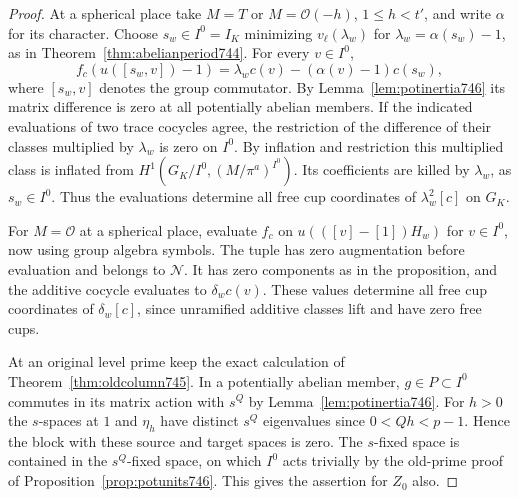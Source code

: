 \documentclass[a4paper,11pt]{article}
\theoremstyle{definition}
\theoremstyle{remark}
\numberwithin{equation}{section}
\begin{document}
\begin{proof}
At a spherical place take \(M=T\) or \(M=\mathcal O(-h)\),
\(1\le h<t'\), and write \(\alpha\) for its character. Choose
\(s_w\in I^0=I_K\) minimizing \(v_\ell(\lambda_w)\) for
\(\lambda_w=\alpha(s_w)-1\), as in
Theorem~\ref{thm:abelianperiod744}. For every \(v\in I^0\),
\[
 f_c(u([s_w,v])-1)=
      \lambda_w c(v)-(\alpha(v)-1)c(s_w),
\]
where \([s_w,v]\) denotes the group commutator. By
Lemma~\ref{lem:potinertia746} its matrix difference is zero at
all potentially abelian members. If the indicated evaluations
of two trace cocycles agree, the restriction of the difference
of their classes multiplied by \(\lambda_w\) is zero on \(I^0\).
By inflation and restriction this multiplied class is inflated
from \(H^1(G_K/I^0,(M/\pi^a)^{I^0})\). Its coefficients are
killed by \(\lambda_w\), as \(s_w\in I^0\). Thus the evaluations
determine all free cup coordinates of \(\lambda_w^2[c]\)
on \(G_K\).

For \(M=\mathcal O\) at a spherical place, evaluate \(f_c\)
on \(u(([v]-[1])H_w)\) for \(v\in I^0\), now using group
algebra symbols. The tuple has zero augmentation before
evaluation and belongs to \(\mathcal N\). It has zero components
as in the proposition, and the additive cocycle evaluates to
\(\delta_w c(v)\). These values determine all free cup
coordinates of \(\delta_w[c]\), since unramified additive
classes lift and have zero free cups.

At an original level prime keep the exact calculation of
Theorem~\ref{thm:oldcolumn745}. In a potentially abelian member,
\(g\in P\subset I^0\) commutes in its matrix action with
\(s^Q\) by Lemma~\ref{lem:potinertia746}. For \(h>0\) the
\(s\)-spaces at \(1\) and \(\eta_h\) have distinct \(s^Q\)
eigenvalues since \(0<Qh<p-1\). Hence the block with these
source and target spaces is zero. The \(s\)-fixed space is
contained in the \(s^Q\)-fixed space, on which \(I^0\) acts
trivially by the old-prime proof of Proposition~\ref{prop:potunits746}.
This gives the assertion for \(Z_0\) also.


\end{proof}
\end{document}
